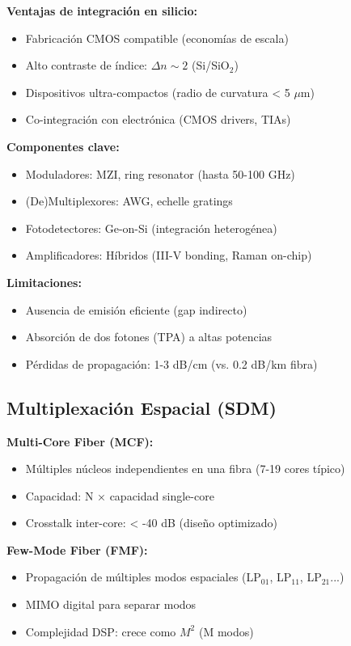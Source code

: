 \documentclass[11pt,a4paper]{article}
\begin{document}
\textbf{Ventajas de integración en silicio:}
\begin{itemize}
    \item Fabricación CMOS compatible (economías de escala)
    \item Alto contraste de índice: $\Delta n \sim 2$ (Si/SiO$_2$)
    \item Dispositivos ultra-compactos (radio de curvatura < 5 $\mu$m)
    \item Co-integración con electrónica (CMOS drivers, TIAs)
\end{itemize}

\textbf{Componentes clave:}
\begin{itemize}
    \item Moduladores: MZI, ring resonator (hasta 50-100 GHz)
    \item (De)Multiplexores: AWG, echelle gratings
    \item Fotodetectores: Ge-on-Si (integración heterogénea)
    \item Amplificadores: Híbridos (III-V bonding, Raman on-chip)
\end{itemize}

\textbf{Limitaciones:}
\begin{itemize}
    \item Ausencia de emisión eficiente (gap indirecto)
    \item Absorción de dos fotones (TPA) a altas potencias
    \item Pérdidas de propagación: 1-3 dB/cm (vs. 0.2 dB/km fibra)
\end{itemize}

\subsection{Multiplexación Espacial (SDM)}

\textbf{Multi-Core Fiber (MCF):}
\begin{itemize}
    \item Múltiples núcleos independientes en una fibra (7-19 cores típico)
    \item Capacidad: N × capacidad single-core
    \item Crosstalk inter-core: < -40 dB (diseño optimizado)
\end{itemize}

\textbf{Few-Mode Fiber (FMF):}
\begin{itemize}
    \item Propagación de múltiples modos espaciales (LP$_{01}$, LP$_{11}$, LP$_{21}$...)
    \item MIMO digital para separar modos
    \item Complejidad DSP: crece como $M^2$ (M modos)
\end{itemize}
\end{document}
